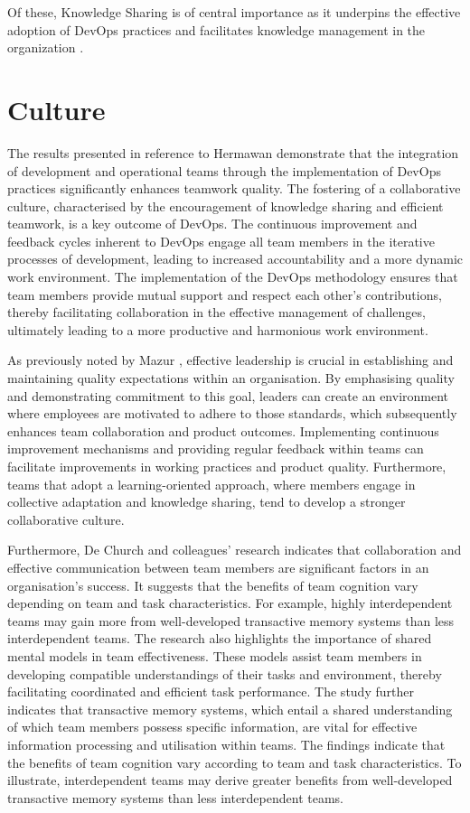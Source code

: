 Of these, Knowledge Sharing is of central importance as it underpins the effective adoption of DevOps practices and facilitates knowledge management in the organization
\cite{Azad2023DevOps} .

\section{Culture}

The results presented in reference to Hermawan \cite{Hermawan2021DevOpsTeamwork} demonstrate that the integration of development and operational teams through the implementation of DevOps practices significantly enhances teamwork quality. The fostering of a collaborative culture, characterised by the encouragement of knowledge sharing and efficient teamwork, is a key outcome of DevOps. The continuous improvement and feedback cycles inherent to DevOps engage all team members in the iterative processes of development, leading to increased accountability and a more dynamic work environment. The implementation of the DevOps methodology ensures that team members provide mutual support and respect each other’s contributions, thereby facilitating collaboration in the effective management of challenges, ultimately leading to a more productive and harmonious work environment.

As previously noted by Mazur \cite{Mazur2023}, effective leadership is crucial in establishing and maintaining quality expectations within an organisation. By emphasising quality and demonstrating commitment to this goal, leaders can create an environment where employees are motivated to adhere to those standards, which subsequently enhances team collaboration and product outcomes. Implementing continuous improvement mechanisms and providing regular feedback within teams can facilitate improvements in working practices and product quality. Furthermore, teams that adopt a learning-oriented approach, where members engage in collective adaptation and knowledge sharing, tend to develop a stronger collaborative culture.

Furthermore, De Church and colleagues' research \cite{Dechurch2010} indicates that collaboration and effective communication between team members are significant factors in an organisation's success. It suggests that the benefits of team cognition vary depending on team and task characteristics. For example, highly interdependent teams may gain more from well-developed transactive memory systems than less interdependent teams. The research also highlights the importance of shared mental models in team effectiveness. These models assist team members in developing compatible understandings of their tasks and environment, thereby facilitating coordinated and efficient task performance. The study further indicates that transactive memory systems, which entail a shared understanding of which team members possess specific information, are vital for effective information processing and utilisation within teams. The findings indicate that the benefits of team cognition vary according to team and task characteristics. To illustrate, interdependent teams may derive greater benefits from well-developed transactive memory systems than less interdependent teams.


